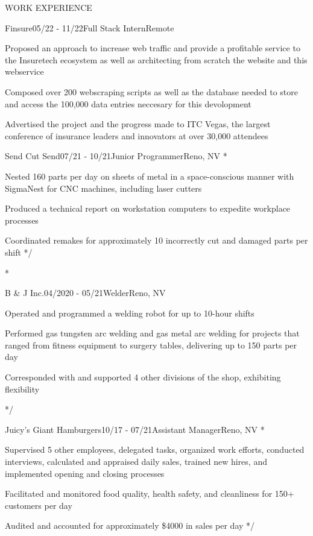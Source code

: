 \documentclass{resume} %
\begin{document}
\begin{rSection}{WORK EXPERIENCE}

	\begin{rSubsection}{Finsure}{05/22 - 11/22}{Full Stack Intern}{Remote}
		\item Proposed an approach to increase web traffic and provide a profitable service to the Insuretech 
		ecosystem as well as architecting from scratch the website and this webservice
		\item Composed over 200 webscraping scripts as well as the database needed to store and access the 100,000 data entries neccesary for this devolopment
		\item Advertised the project and the progress made to ITC Vegas, the largest conference of insurance leaders and innovators at over 30,000 attendees
	\end{rSubsection}

	\begin{emptyrSubsection}{Send Cut Send}{07/21 - 10/21}{Junior Programmer}{Reno, NV}
		\/*
		\item Nested 160 parts per day on sheets of metal in a space-conscious manner with SigmaNest for CNC machines,
		including laser cutters
		\item Produced a technical report on workstation computers to expedite workplace processes
		\item Coordinated remakes for approximately 10 incorrectly cut and damaged parts per shift
		*/
	\end{emptyrSubsection}

	\/*
	\begin{rSubsection}{B \& J Inc.}{04/2020 - 05/21}{Welder}{Reno, NV}
		\item Operated and programmed a welding robot for up to 10-hour shifts
		\item Performed gas tungsten arc welding and gas metal arc welding for projects that ranged from fitness equipment to surgery tables, delivering up to 150 parts per day
		\item Corresponded with and supported 4 other divisions of the shop, exhibiting flexibility
	\end{rSubsection}
	*/

	\begin{emptyrSubsection}{Juicy's Giant Hamburgers}{10/17 - 07/21}{Assistant Manager}{Reno, NV}
		\/*
		\item Supervised 5 other employees, delegated tasks, organized work efforts, conducted interviews, calculated and
		appraised daily sales, trained new hires, and implemented opening and closing processes
		\item Facilitated and monitored food quality, health safety, and cleanliness for 150+ customers per day
		\item Audited and accounted for approximately \$4000 in sales per day
		*/
	\end{emptyrSubsection}

\end{rSection}
\end{document}
